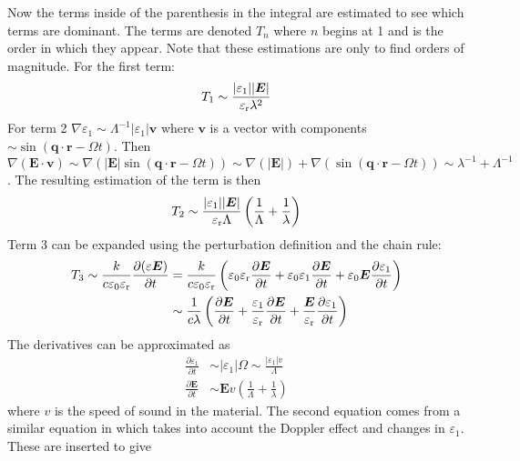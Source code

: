 \documentclass[11pt,twoside]{eitExjobb}
\begin{document}
	Now the terms inside of the parenthesis in the integral are estimated to see which terms are dominant. The terms are denoted $T_n$ where $n$ begins at 1 and is the order in which they appear. Note that these estimations are only to find orders of magnitude. For the first term:
	\begin{equation*}
		T_1 \sim \frac{|\varepsilon_1| |\bm{E}|}{\varepsilon_{\mathrm{r}} \lambda^2}
	\end{equation*}
	For term 2 $\nabla \varepsilon_1 \sim \Lambda^{-1} |\varepsilon_1| \bm{v}$ where $\bm{v}$ is a vector with components $\sim \sin(\bm{q} \cdot \bm{r} - \Omega t)$. Then $\nabla (\bm{E} \cdot \bm{v}) \sim \nabla(|\bm{E}| \sin(\bm{q} \cdot \bm{r} - \Omega t)) \sim \nabla(|\bm{E}|) + \nabla(\sin(\bm{q} \cdot \bm{r} - \Omega t)) \sim \lambda^{-1} + \Lambda^{-1}$. The resulting estimation of the term is then
	\begin{equation*}
		T_2 \sim \frac{|\varepsilon_1| |\bm{E}|}{\varepsilon_{\mathrm{r}} \Lambda} \left( \frac{1}{\Lambda} + \frac{1}{\lambda} \right)
	\end{equation*}
	Term 3 can be expanded using the perturbation definition and the chain rule:
	\begin{equation*}
	\begin{split}
		T_3 \sim \frac{k}{c\varepsilon_0\varepsilon_{\mathrm{r}}} \frac{\partial (\varepsilon \bm{E})}{\partial t} &= \frac{k}{c\varepsilon_0\varepsilon_{\mathrm{r}}} \left( \varepsilon_0\varepsilon_{\mathrm{r}} \frac{\partial \bm{E}}{\partial t} + \varepsilon_0\varepsilon_1 \frac{\partial \bm{E}}{\partial t} + \varepsilon_0\bm{E} \frac{\partial \varepsilon_1}{\partial t}\right) \\
		&\sim \frac{1}{c\lambda} \left( \frac{\partial \bm{E}}{\partial t} + \frac{\varepsilon_1}{\varepsilon_{\mathrm{r}}} \frac{\partial \bm{E}}{\partial t} + \frac{\bm{E}}{\varepsilon_{\mathrm{r}}} \frac{\partial \varepsilon_1}{\partial t} \right)
	\end{split}
	\end{equation*}
	The derivatives can be approximated as
	\begin{align*}
		\frac{\partial \varepsilon_1}{\partial t} &\sim |\varepsilon_1|\Omega \sim \frac{|\varepsilon_1| v}{\Lambda} \\
		\frac{\partial \bm{E}}{\partial t} &\sim \bm{E} v \left( \frac{1}{\Lambda} + \frac{1}{\lambda} \right)
	\end{align*}
	where $v$ is the speed of sound in the material. The second equation comes from a similar equation in \cite{Tatarskii1971} which takes into account the Doppler effect and changes in $\varepsilon_1$. These are inserted to give
\end{document}
